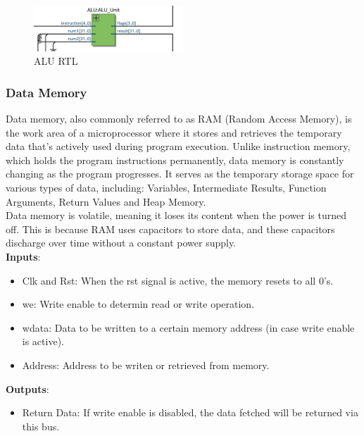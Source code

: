 \documentclass[9pt,a4paper,twoside]{tau}
\begin{document}
    \begin{figure}[h]  %
        \centering  %
        \includegraphics[width=0.5\textwidth]{images/ALUImg.png}
        \caption{ALU RTL}
        \label{fig:ALU RTL}
    \end{figure}


\subsubsection{Data Memory}
    Data memory, also commonly referred to as RAM (Random Access Memory), is the work area of a microprocessor where it stores and retrieves the temporary data that's actively used during program execution. Unlike instruction memory, which holds the program instructions permanently, data memory is constantly changing as the program progresses. It serves as the temporary storage space for various types of data, including:
    Variables, Intermediate Results, Function Arguments, Return Values and Heap Memory.\\
    Data memory is volatile, meaning it loses its content when the power is turned off. This is because RAM uses capacitors to store data, and these capacitors discharge over time without a constant power supply.\\

    \textbf{Inputs}:
    \begin{itemize}
        \item Clk and Rst: When the rst signal is active, the memory resets to all 0's.
        \item we: Write enable to determin read or write operation.
        \item wdata: Data to be written to a certain memory address (in case write enable is active).
        \item Address: Address to be writen or retrieved from memory.
    \end{itemize}
    
    \textbf{Outputs}:
    \begin{itemize}
        \item Return Data: If write enable is disabled, the data fetched will be returned via this bus.
    \end{itemize}
\end{document}
